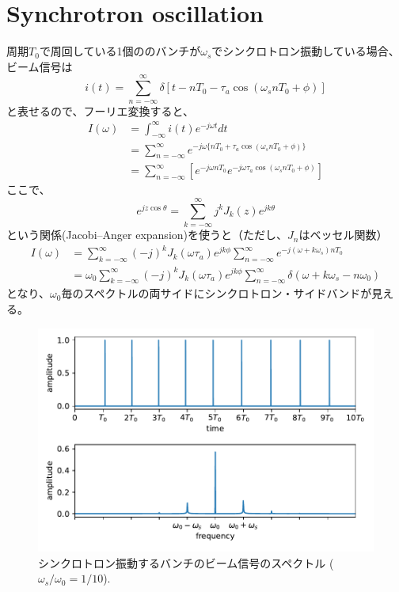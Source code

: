 \documentclass[]{jlreq}
\theoremstyle{definition}
\begin{document}
\section{Synchrotron oscillation}
周期$T_0$で周回している1個ののバンチが$\omega_s$でシンクロトロン振動している場合、ビーム信号は
%
\begin{equation}
  i(t) = \sum_{n=-\infty}^{\infty}\delta[t - n T_0 - \tau_a \cos(\omega_s n T_0 + \phi)]
\end{equation}
%
と表せるので、フーリエ変換すると、
%
\begin{align}
  I(\omega) &= \int_{-\infty}^{\infty} i(t) e^{-j\omega t} dt \\
  &= \sum_{n = -\infty}^{\infty} e^{-j\omega\{n T_0 + \tau_a \cos(\omega_s n T_0 + \phi)\}} \\
  &= \sum_{n = -\infty}^{\infty} \left[ e^{-j\omega n T_0 } e^{-j \omega \tau_a \cos(\omega_s n T_0 + \phi)} \right]
\end{align}
%
ここで、
%
\begin{equation}
  e^{jz\cos\theta} = \sum_{k = -\infty}^{\infty} j^k J_k(z) e^{j k \theta}
\end{equation}
%
という関係(Jacobi–Anger expansion)を使うと（ただし、$J_n$はベッセル関数）
%
\begin{align}
  I(\omega) &= \sum_{k = -\infty}^{\infty} (-j)^k J_k(\omega \tau_a) e^{j k \phi}
      \sum_{n = -\infty}^{\infty} e^{-j (\omega + k \omega_s) n T_0} \\
    &= \omega_0 \sum_{k = -\infty}^{\infty} (-j)^k J_k(\omega \tau_a) e^{j k \phi}
        \sum_{n = -\infty}^{\infty} \delta(\omega + k\omega_s - n \omega_0)
\end{align}
%
となり、$\omega_0$毎のスペクトルの両サイドにシンクロトロン・サイドバンドが見える。
%
\begin{figure}[hbt]
  \begin{center}
    \includegraphics[width=12cm,clip]{synchrotron_bunch.pdf}
    \caption{シンクロトロン振動するバンチのビーム信号のスペクトル ($\omega_s/\omega_0 = 1/10$).}
   \label{synchro_bunch}
  \end{center}
\end{figure}
\clearpage
\end{document}
